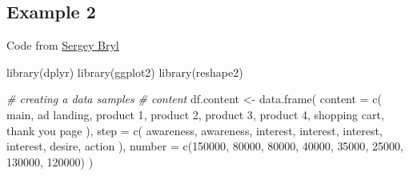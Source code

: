 \documentclass[
]{book}
\newenvironment{Shaded}{\begin{snugshade}}{\end{snugshade}}
\newcommand{\AttributeTok}[1]{\textcolor[rgb]{0.77,0.63,0.00}{#1}}
\newcommand{\CommentTok}[1]{\textcolor[rgb]{0.56,0.35,0.01}{\textit{#1}}}
\newcommand{\DecValTok}[1]{\textcolor[rgb]{0.00,0.00,0.81}{#1}}
\newcommand{\FunctionTok}[1]{\textcolor[rgb]{0.00,0.00,0.00}{#1}}
\newcommand{\NormalTok}[1]{#1}
\newcommand{\OtherTok}[1]{\textcolor[rgb]{0.56,0.35,0.01}{#1}}
\newcommand{\StringTok}[1]{\textcolor[rgb]{0.31,0.60,0.02}{#1}}
\begin{document}
\hypertarget{example-2-2}{%
\subsection{Example 2}\label{example-2-2}}

Code from \href{https://www.analyzecore.com/2015/06/23/sales-funnel-visualization-with-r/}{Sergey Bryl}

\begin{Shaded}
\begin{Highlighting}[]
\FunctionTok{library}\NormalTok{(dplyr)}
\FunctionTok{library}\NormalTok{(ggplot2)}
\FunctionTok{library}\NormalTok{(reshape2)}

\CommentTok{\# creating a data samples}
\CommentTok{\# content}
\NormalTok{df.content }\OtherTok{\textless{}{-}} \FunctionTok{data.frame}\NormalTok{(}
    \AttributeTok{content =} \FunctionTok{c}\NormalTok{(}
        \StringTok{\textquotesingle{}main\textquotesingle{}}\NormalTok{,}
        \StringTok{\textquotesingle{}ad landing\textquotesingle{}}\NormalTok{,}
        \StringTok{\textquotesingle{}product 1\textquotesingle{}}\NormalTok{,}
        \StringTok{\textquotesingle{}product 2\textquotesingle{}}\NormalTok{,}
        \StringTok{\textquotesingle{}product 3\textquotesingle{}}\NormalTok{,}
        \StringTok{\textquotesingle{}product 4\textquotesingle{}}\NormalTok{,}
        \StringTok{\textquotesingle{}shopping cart\textquotesingle{}}\NormalTok{,}
        \StringTok{\textquotesingle{}thank you page\textquotesingle{}}
\NormalTok{    ),}
    \AttributeTok{step =} \FunctionTok{c}\NormalTok{(}
        \StringTok{\textquotesingle{}awareness\textquotesingle{}}\NormalTok{,}
        \StringTok{\textquotesingle{}awareness\textquotesingle{}}\NormalTok{,}
        \StringTok{\textquotesingle{}interest\textquotesingle{}}\NormalTok{,}
        \StringTok{\textquotesingle{}interest\textquotesingle{}}\NormalTok{,}
        \StringTok{\textquotesingle{}interest\textquotesingle{}}\NormalTok{,}
        \StringTok{\textquotesingle{}interest\textquotesingle{}}\NormalTok{,}
        \StringTok{\textquotesingle{}desire\textquotesingle{}}\NormalTok{,}
        \StringTok{\textquotesingle{}action\textquotesingle{}}
\NormalTok{    ),}
    \AttributeTok{number =} \FunctionTok{c}\NormalTok{(}\DecValTok{150000}\NormalTok{, }\DecValTok{80000}\NormalTok{,}
               \DecValTok{80000}\NormalTok{, }\DecValTok{40000}\NormalTok{, }\DecValTok{35000}\NormalTok{, }\DecValTok{25000}\NormalTok{,}
               \DecValTok{130000}\NormalTok{,}
               \DecValTok{120000}\NormalTok{)}
\NormalTok{)}

\end{Highlighting}
\end{Shaded}
\end{document}
